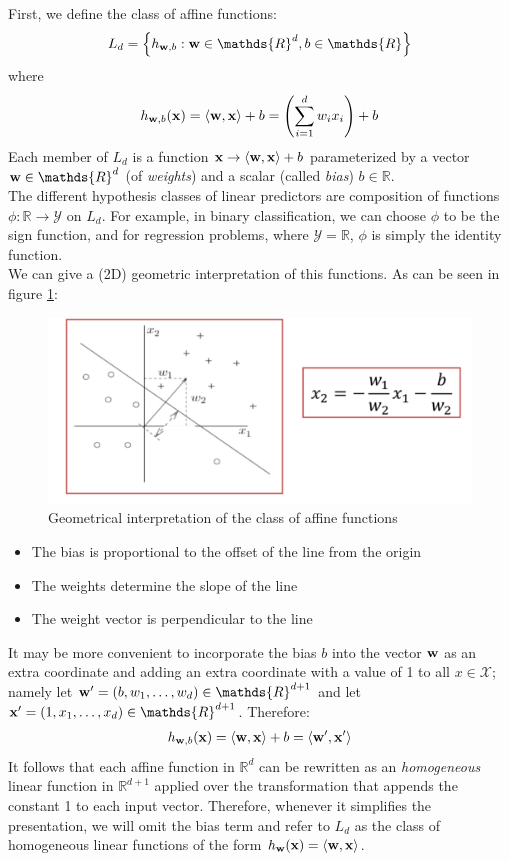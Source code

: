 \documentclass[12pt]{report}
\theoremstyle{plain}
\newcommand\mcl[1]{\mathcal{#1}}
\newcommand\sprod[2]{\langle \vb{#1},\vb{#2}\rangle}
\begin{document}
\begin{flushleft}
First, we define the class of affine functions:
\[ L_d=\left\{h_{\vb{w},b}:\vb{w}\in\mathds{R}^d,b\in\mathds{R} \right\} \]
where
\[ h_{\vb{w},b}(\vb{x})= \sprod{w}{x}+b = \left(\sum_{i=1}^d w_ix_i\right)+b \]
Each member of $L_d$ is a function $\vb{x}\to\sprod{w}{x}+b$ parameterized by a 
vector $\vb{w}\in\mathds{R}^d$ (of \textit{weights}) and a scalar (called 
\textit{bias}) $b\in\mathds{R}$.\\
The different hypothesis classes of linear predictors are composition of functions $\phi:\mathds{R}\to\mcl{Y}$ on $L_d$. For example, in binary classification, we can choose $\phi$ to be the sign function, and for regression problems, where $\mcl{Y}=\mathds{R}$, $\phi$ is simply the identity function.\\
We can give a (2D) geometric interpretation of this functions. As can be seen in figure \ref{fig:affine_geom}:
\begin{figure}[!h]
	\centering
	\includegraphics[scale=0.5]{images/affine_geometry.pdf}
	\caption{Geometrical interpretation of the class of affine functions}
	\label{fig:affine_geom}
\end{figure}
\begin{itemize}
	\item The bias is proportional to the offset of the line from the origin
	\item The weights determine the slope of the line
	\item The weight vector is perpendicular to the line
\end{itemize} 
It may be more convenient to incorporate the bias $b$ into the vector $\vb{w}$ as an extra coordinate and adding an extra coordinate with a value of 1 to all $x\in\mcl{X}$; namely let $\vb{w}'=(b,w_1,\dots,w_d)\in\mathds{R}^{d+1}$ and let $\vb{x}'=(1,x_1,\dots,x_d)\in\mathds{R}^{d+1}$. Therefore:
\[ h_{\vb{w},b}(\vb{x})=\sprod{w}{x}+b=\sprod{w'}{x'} \]
It follows that each affine function in $\mathds{R}^d$ can be rewritten as an 
\textit{homogeneous} linear function in $\mathds{R}^{d+1}$ applied over the 
transformation that appends the constant 1 to each input vector. Therefore, 
whenever it simplifies the presentation, we will omit the bias term and refer 
to $L_d$ as the class of homogeneous linear functions of the form 
$h_{\vb{w}}(\vb{x})=\sprod{w}{x}$.


\end{flushleft}
\end{document}
